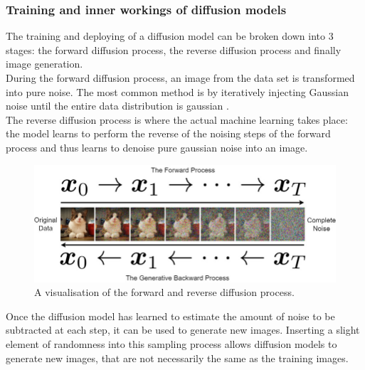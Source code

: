 \subsubsection{Training and inner workings of diffusion models}
The training and deploying of a diffusion model can be broken down into 3 stages: the forward diffusion process, the reverse diffusion process and finally image generation.\\ During the forward diffusion process, an image from the data set is transformed into pure noise. The most common method is by iteratively injecting Gaussian noise until the entire data distribution is gaussian \autocite{noauthor_what_2024}.\\ The reverse diffusion process is where the actual machine learning takes place: the model learns to perform the reverse of the noising steps of the forward process and thus learns to denoise pure gaussian noise into an image.
\begin{figure}[H]
    \centering
    \includegraphics[width=0.8\linewidth]{Images/Background/The-forward-and-backward-processes-of-the-diffusion-model-The-credit-of-the-used-images.jpg}
    \caption{A visualisation of the forward and reverse diffusion process.}
    \label{fig:enter-label}
\end{figure}
Once the diffusion model has learned to estimate the amount of noise to be subtracted at each step, it can be used to generate new images. Inserting a slight element of randomness into this sampling process allows diffusion models to generate new images, that are not necessarily the same as the training images.
